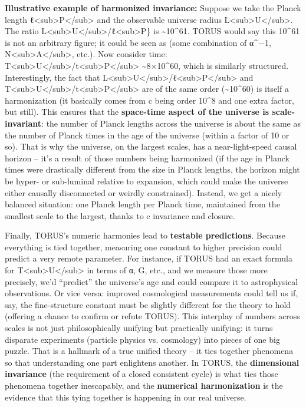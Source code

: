 \textbf{Illustrative example of harmonized invariance:} Suppose we take
the Planck length
ℓ\textless{}sub\textgreater{}P\textless{}/sub\textgreater{} and the
observable universe radius
L\textless{}sub\textgreater{}U\textless{}/sub\textgreater{}. The ratio
L\textless{}sub\textgreater{}U\textless{}/sub\textgreater{}/ℓ\textless{}sub\textgreater{}P\}
is \textasciitilde{}10\^{}61. TORUS would say this 10\^{}61 is not an
arbitrary figure; it could be seen as (some combination of α\^{}−1,
N\textless{}sub\textgreater{}A\textless{}/sub\textgreater{}, etc.). Now
consider time:
T\textless{}sub\textgreater{}U\textless{}/sub\textgreater{}/t\textless{}sub\textgreater{}P\textless{}/sub\textgreater{}
\textasciitilde{}8×10\^{}60, which is similarly structured.
Interestingly, the fact that
L\textless{}sub\textgreater{}U\textless{}/sub\textgreater{}/ℓ\textless{}sub\textgreater{}P\textless{}/sub\textgreater{}
and
T\textless{}sub\textgreater{}U\textless{}/sub\textgreater{}/t\textless{}sub\textgreater{}P\textless{}/sub\textgreater{}
are of the same order (\textasciitilde{}10\^{}60) is itself a
harmonization (it basically comes from c being order 10\^{}8 and one
extra factor, but still). This ensures that the \textbf{space-time
aspect of the universe is scale-invariant}: the number of Planck lengths
across the universe is about the same as the number of Planck times in
the age of the universe (within a factor of 10 or so). That is why the
universe, on the largest scales, has a near-light-speed causal horizon
-- it's a result of those numbers being harmonized (if the age in Planck
times were drastically different from the size in Planck lengths, the
horizon might be hyper- or sub-luminal relative to expansion, which
could make the universe either causally disconnected or weirdly
constrained). Instead, we get a nicely balanced situation: one Planck
length per Planck time, maintained from the smallest scale to the
largest, thanks to c invariance and closure​.

Finally, TORUS's numeric harmonies lead to \textbf{testable
predictions}. Because everything is tied together, measuring one
constant to higher precision could predict a very remote parameter. For
instance, if TORUS had an exact formula for
T\textless{}sub\textgreater{}U\textless{}/sub\textgreater{} in terms of
α, G, etc., and we measure those more precisely, we'd ``predict'' the
universe's age and could compare it to astrophysical observations. Or
vice versa: improved cosmological measurements could tell us if, say,
the fine-structure constant must be slightly different for the theory to
hold (offering a chance to confirm or refute TORUS). This interplay of
numbers across scales is not just philosophically unifying but
practically unifying: it turns disparate experiments (particle physics
vs. cosmology) into pieces of one big puzzle. That is a hallmark of a
true unified theory -- it ties together phenomena so that understanding
one part enlightens another. In TORUS, the \textbf{dimensional
invariance} (the requirement of a closed consistent cycle) is what ties
those phenomena together inescapably, and the \textbf{numerical
harmonization} is the evidence that this tying together is happening in
our real universe​.

